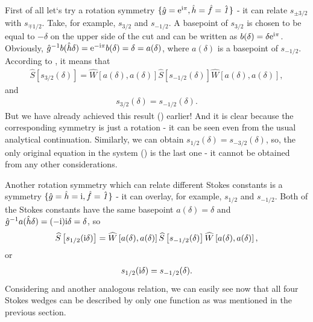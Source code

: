 \documentclass[12pt]{iopart}
\def\S{\widehat{S}}
\def\W{\widehat{W}}
\def\f{\hat{f}}
\def\g{\hat{g}}
\def\h{\hat{h}}
\def\unity{\hat{\it 1}}
\begin{document}
First of all let`s try a rotation symmetry $\{\g=\rme^{\rmi\pi},\h=\f=\unity\}$ - 
it can relate $s_{\pm 3/2}$ with $s_{\mp 1/2}$. Take, for example, $s_{3/2}$ and $s_{-1/2}$. 
A basepoint of $s_{3/2}$ is chosen to be equal to $-\delta$ on the upper side of the cut 
and can be written as $b(\delta)=\delta \mathrm{e}^{\mathrm{i}\pi}$. 
Obviously, $\g^{-1}b(\h\delta)=\rme^{-\rmi\pi}b(\delta)=\delta=a(\delta)$, where $a(\delta)$ 
is a basepoint of $s_{-1/2}$. According to , it means that
\begin{eqnarray}
\S\left[ s_{3/2}(\delta) \right] = 
\W \left[ a(\delta), a(\delta) \right] 
\S \left[ s_{-1/2}(\delta) \right]
\W \left[ a(\delta), a(\delta) \right],
\end{eqnarray}
and
\begin{eqnarray}
s_{3/2}(\delta) = s_{-1/2}(\delta).
\label{eq:websym_1}
\end{eqnarray}
But we have already achieved this result () earlier! And it is clear 
because the corresponding symmetry is just a rotation - it can be seen even from the 
usual analytical continuation. Similarly, we can obtain $s_{1/2}(\delta)=s_{-3/2}(\delta)$, 
so, the only original equation in the system () is the last one - 
it cannot be obtained from any other considerations.

Another rotation symmetry which can relate different Stokes constants is a symmetry 
$\{\g=\h=\rmi,\f=\unity\}$ - it can overlay, for example, 
$s_{1/2}$ and $s_{-1/2}$. Both of the Stokes constants have the same 
basepoint $a(\delta)=\delta$ and $\g^{-1}a(\h\delta)=(-\rmi)\rmi\delta=\delta$, so
\begin{eqnarray}
\S \left[ s_{1/2}(\rmi \delta) \right] = 
\W \left[ a(\delta), a(\delta) \right]
\S \left[ s_{-1/2}(\delta) \right]
\W \left[ a(\delta), a(\delta) \right],
\end{eqnarray}
or
\begin{eqnarray}
s_{1/2}(\mathrm{i} \delta) = s_{-1/2}(\delta).
\label{eq:websym_2}
\end{eqnarray}
Considering  and another analogous relation, we can easily 
see now that all four Stokes wedges can be described by only one function as 
was mentioned in the previous section. 
\end{document}
